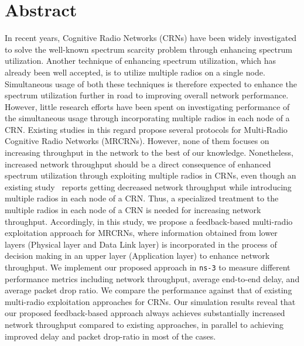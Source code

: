 \chapter*{Abstract}
 In recent years, Cognitive Radio Networks (CRNs) have been widely investigated to solve the well-known spectrum scarcity problem through enhancing spectrum utilization. Another technique of enhancing spectrum utilization, which has already been well accepted, is to utilize multiple radios on a single node. Simultaneous usage of both these techniques is therefore expected to enhance the spectrum utilization further in road to improving overall network performance. However, little research efforts have been spent on investigating performance of the simultaneous usage through incorporating multiple radios in each node of a CRN. Existing studies in this regard propose several protocols for Multi-Radio Cognitive Radio Networks (MRCRNs). However, none of them focuses on increasing throughput in the network to the best of our knowledge. Nonetheless, increased network throughput should be a direct consequence of enhanced spectrum utilization through exploiting multiple radios in CRNs, even though an existing study~\cite{khan2015towards} reports getting decreased network throughput while introducing multiple radios in each node of a CRN. Thus, a specialized treatment to the multiple radios in each node of a CRN is needed for increasing network throughput. Accordingly, in this study, we propose a feedback-based multi-radio exploitation approach for MRCRNs, where information obtained from lower layers (Physical layer and Data Link layer) is incorporated in the process of decision making in an upper layer (Application layer) to enhance network throughput. We implement our proposed approach in \texttt{ns-3} to measure different performance metrics including network throughput, average end-to-end delay, and average packet drop ratio. We compare the performance against that of existing multi-radio exploitation approaches for CRNs. Our simulation results reveal that our proposed feedback-based approach always achieves substantially increased network throughput compared to existing approaches, in parallel to achieving improved delay and packet drop-ratio in most of the cases.

